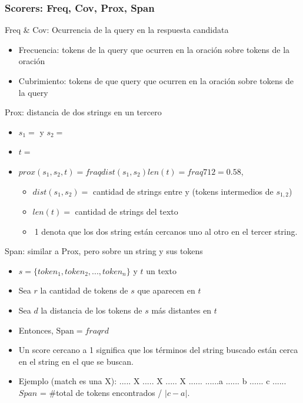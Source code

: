 \begin{frame}
\frametitle{Scorers: Freq, Cov, Prox, Span}
  \begin{block}{Freq \& Cov: Ocurrencia de la query en la respuesta candidata}
  \begin{itemize}
      \item Frecuencia: tokens de la query que ocurren en la oración sobre tokens de la oración 
      \item Cubrimiento: tokens de que query que ocurren en la oración sobre tokens de la query
  \end{itemize}
  \end{block}
  \begin{block}{Prox: distancia de dos strings en un tercero}
  \begin{itemize}
      \item $s_1=$ y $s_2=$
      \item $t=$
      \item $prox(s_1, s_2, t)= fraq{dist(s_1, s_2)}{len(t)} = fraq{7}{12} = 0.58 $, 
      \begin{itemize}
          \item $dist(s_1, s_2)=$ cantidad de strings entre  y  (tokens intermedios de $s_{1,2}$)
          \item $len(t)=$ cantidad de strings del texto
          \item $~$1 denota que los dos string están cercanos uno al otro en el tercer string.
      \end{itemize}
  \end{itemize}
  \end{block}
  \begin{block}{Span: similar a Prox, pero sobre un string y sus tokens}
  \begin{itemize}
  \item $s = \{token_1, token_2, ..., token_n\}$ y $t$ un texto
  \item Sea $r$ la cantidad de tokens de $s$ que aparecen en $t$
  \item Sea $d$ la distancia de los tokens de $s$ más distantes en $t$
  \item Entonces, $\text{Span}=fraq{r}{d}$
  \item Un score cercano a 1 significa que los términos del string buscado están cerca en el string en el que se buscan.
  \item Ejemplo (match es una X):
        ..... X ..... X ..... X ...... \newline
        ......a ...... b ...... c ...... \newline
    $Span$ = \#total de tokens encontrados / $| c - a |$.
  \end{itemize}
  \end{block}
\end{frame}

